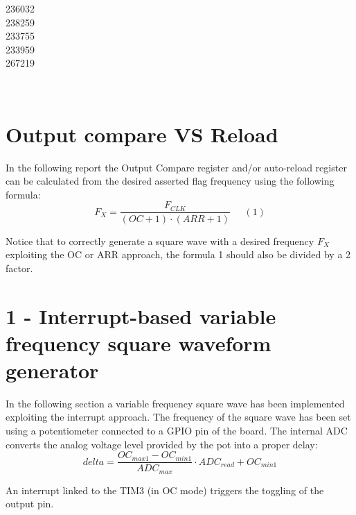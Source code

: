 \documentclass[12pt]{article}
\begin{document}
\begin{titlepage}
\begin{minipage}{0.4\textwidth}
			\begin{flushright} \large
			236032\\													%
			238259\\
            233755\\
            233959\\
            267219\\
            
		\end{flushright}
        
	\end{minipage}\\[2 cm]
	
\end{titlepage}

\newpage
\section*{Output compare VS Reload}
{
	
	In the following report the Output Compare register and/or auto-reload register can be calculated from the desired asserted flag frequency using the following formula:
	\[F_{X}=\frac{F_{CLK}}{(OC+1)\cdot(ARR+1)}\;\;\;\;\; (1)\] 
	
	Notice that to correctly generate a square wave with a desired frequency $F_{X}$ exploiting the OC or ARR approach, the formula 1 should also be divided by a 2 factor.
}

\section*{1 - Interrupt-based variable frequency square waveform generator}

In the following section a variable frequency square wave has been implemented exploiting the interrupt approach. 
The frequency of the square wave has been set using a potentiometer connected to a GPIO pin of the board. 
The internal ADC converts the analog voltage level provided by the pot into a proper delay:
\[ delta = \frac{OC_{max1} - OC_{min1}}{ADC_{max}} \cdot ADC_{read} + OC_{min1}\]

An interrupt linked to the TIM3 (in OC mode) triggers the toggling of the output pin.
 
\end{document}
